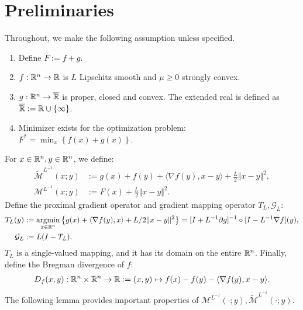 \documentclass[12pt]{article}
\begin{document}
\section{Preliminaries}\label{sec:preliminaries}
    Throughout, we make the following assumption unless specified.
    \begin{assumption}\label{ass:smooth-nsmooth-additive}
        \;
        \begin{enumerate}
            \item Define $F := f + g$.
            \item $f: \mathbb R^n \rightarrow \mathbb R$ is $L$ Lipschitz smooth and $\mu \ge 0$ strongly convex.
            \item $g: \mathbb R^n \rightarrow \overline {\mathbb R}$ is proper, closed and convex. The extended real is defined as $\overline {\mathbb R} := \mathbb R \cup \{\infty\}$.
            \item Minimizer exists for the optimization problem: $F^* = \min_x \left\lbrace f(x) + g(x)\right\rbrace$.
        \end{enumerate}
    \end{assumption}
    For $x \in \mathbb R^n, y \in \mathbb R^n$, we define:
    \begin{align}
        \widetilde{\mathcal M}^{L^{-1}}
        (x; y)
        &:=
        g(x) + f(y) + \langle \nabla f(y), x - y\rangle
        + \frac{L}{2}\Vert x - y\Vert^2,  \label{eqn:pg-model-func}
        \\
        \mathcal M^{L^{-1}}(x; y) &:= F(x) + \frac{L}{2}\Vert x - y\Vert^2.
        \label{eqn:pp-model-func}
    \end{align}
    Define the proximal gradient operator and gradient mapping operator $T_L, \mathcal G_L$:
    \begin{align*}
        T_L(y) &:= \mathop{\rm argmin}\limits_{x \in \mathbb R^n} \left\lbrace
            g(x) + \langle \nabla f(y), x\rangle + L/2\Vert x - y\Vert^2
        \right\rbrace = [I + L^{-1}\partial g]^{-1}\circ [I - L^{-1}\nabla f](y),
        \\
        \mathcal G_L
        &:= L(I - T_L).
    \end{align*}
    $T_L$ is a single-valued mapping, and it has its domain on the entire $\mathbb R^n$.
    Finally, define the Bregman divergence of $f$:
    \begin{align*}
        D_f(x, y): \mathbb R^n \times \mathbb R^n \rightarrow \mathbb R
        \vcentcolon= (x, y)\mapsto f(x) - f(y) - \langle \nabla f(y), x - y\rangle.
    \end{align*}
    The following lemma provides important properties of $\mathcal M^{L^{-1}}(\cdot; y), \widetilde{\mathcal M}^{L^{-1}}(\cdot; y)$.
\end{document}
